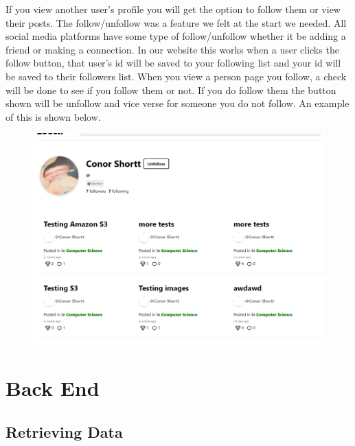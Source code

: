 If you view another user's profile you will get the option to follow them or view their posts. 
The follow/unfollow was a feature we felt at the start we needed. All social media platforms have some type of follow/unfollow whether it be adding a friend or making a connection. In our website this works when a user clicks the follow button, that user's id will be saved to your following list and your id will be saved to their followers list. When you view a person page you follow, a check will be done to see if you follow them or not. If you do follow them the button shown will be unfollow and vice verse for someone you do not follow. An example of this is shown below.
\begin{figure}[H]
  \centering
  \includegraphics[scale=0.4]{img/OtherProfile.PNG}
  \label{fig:OtherProfile}
\end{figure}

\section{Back End}

\subsection{Retrieving Data}

